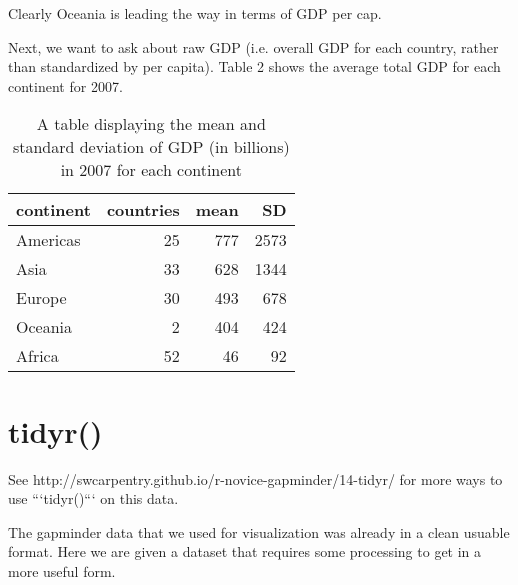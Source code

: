 \documentclass[english]{article}\usepackage[]{graphicx}\usepackage[]{color}
\begin{document}
Clearly Oceania is leading the way in terms of GDP per cap.

Next, we want to ask about raw GDP (i.e. overall GDP for each country, rather than standardized by per capita). Table 2 shows the average total GDP for each continent for 2007.


\begin{table}[H]
\centering
\begin{tabular}{lrrr}
  \hline
continent & countries & mean & SD \\ 
  \hline
Americas & 25 & 777 & 2573 \\ 
  Asia & 33 & 628 & 1344 \\ 
  Europe & 30 & 493 & 678 \\ 
  Oceania & 2 & 404 & 424 \\ 
  Africa & 52 & 46 & 92 \\ 
   \hline
\end{tabular}
\caption{A table displaying the mean and standard deviation of GDP (in billions) in 2007 for each continent} 
\label{total_gdp_table}
\end{table}


\section{tidyr()}
See http://swcarpentry.github.io/r-novice-gapminder/14-tidyr/ for more ways to use ```tidyr()``` on this data.

The gapminder data that we used for visualization was already in a clean usuable format.  Here we are given a dataset that requires some processing to get in a more useful form.  
\end{document}
